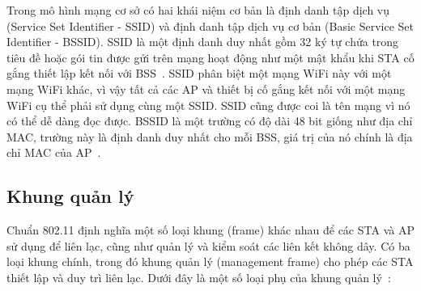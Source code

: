 Trong mô hình mạng cơ sở có hai khái niệm cơ bản là định danh tập dịch vụ (Service Set Identifier - SSID) và định danh tập dịch vụ cơ bản (Basic Service Set Identifier - BSSID). SSID là một định danh duy nhất gồm 32 ký tự chứa trong tiêu đề hoặc gói tin được gửi trên mạng hoạt động như một mật khẩu khi STA cố gắng thiết lập kết nối với BSS~\cite{vasseur2010interconnecting}. SSID phân biệt một mạng WiFi này với một mạng WiFi khác, vì vậy tất cả các AP và thiết bị cố gắng kết nối với một mạng WiFi cụ thể phải sử dụng cùng một SSID. SSID cũng được coi là tên mạng vì nó có thể dễ dàng đọc được. BSSID là một trường có độ dài 48 bit giống như địa chỉ MAC, trường này là định danh duy nhất cho mỗi BSS, giá trị của nó chính là địa chỉ MAC của AP~\cite{ieee2007802}.

\subsection{Khung quản lý}
\newcommand\tab[1][2.5mm]{\hspace*{#1}}
Chuẩn 802.11 định nghĩa một số loại khung (frame) khác nhau để các STA và AP sử dụng để liên lạc, cũng như quản lý và kiểm soát các liên kết không dây. Có ba loại khung chính, trong đó khung quản lý (management frame) cho phép các STA thiết lập và duy trì liên lạc. Dưới đây là một số loại phụ của khung quản lý~\cite{geier2001wireless}:
